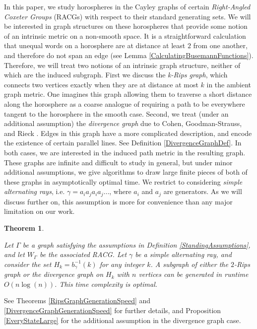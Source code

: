 \documentclass[10pt,a4paper]{amsart}
\newtheorem{theorem}{Theorem}[subsection]
\theoremstyle{definition}
\theoremstyle{remark}
\begin{document}
	In this paper, we study horospheres in the Cayley graphs of certain \textit{Right-Angled Coxeter Groups} (RACGs) with respect to their standard generating sets. We will be interested in graph structures on these horospheres that provide some notion of an intrinsic metric on a non-smooth space. It is a straightforward calculation that unequal words on a horosphere are at distance at least $2$ from one another, and therefore do not span an edge (see Lemma \ref{CalculatingBusemannFunctions}). Therefore, we will treat two notions of an intrinsic graph structure, neither of which are the induced subgraph. First we discuss the \textit{k-Rips graph}, which connects two vertices exactly when they are at distance at most $k$ in the ambient graph metric. One imagines this graph allowing them to traverse a short distance along the horosphere as a coarse analogue of requiring a path to be everywhere tangent to the horosphere in the smooth case. Second, we treat (under an additional assumption) the \textit{divergence graph} due to Cohen, Goodman-Strauss, and Rieck \cite{CGSR}. Edges in this graph have a more complicated description, and encode the existence of certain parallel lines. See Definition \ref{DivergenceGraphDef}. In both cases, we are interested in the induced path metric in the resulting graph. These graphs are infinite and difficult to study in general, but under minor additional assumptions, we give algorithms to draw large finite pieces of both of these graphs in asymptotically optimal time. We restrict to considering \textit{simple alternating rays}, i.e. $\gamma=a_ia_ja_ia_j ...$, where $a_i$ and $a_j$ are generators. As we will discuss further on, this assumption is more for convenience than any major limitation on our work.
	
	\begin{theorem} \label{IntroMainThm}
		
		Let $\Gamma$ be a graph satisfying the assumptions in Definition \ref{StandingAssumptions}, and let $W_\Gamma$ be the associated RACG. Let $\gamma$ be a simple alternating ray, and consider the set $H_k=b_\gamma^{-1}(k)$ for any integer $k$. A subgraph of either the $2$-Rips graph or the divergence graph on $H_k$ with $n$ vertices can be generated in runtime $O(n\log(n))$. This time complexity is optimal.
		
	\end{theorem}
	
	See Theorems \ref{RipsGraphGenerationSpeed} and \ref{DivergenceGraphGenerationSpeed} for further details, and Proposition \ref{EveryStateLarge} for the additional assumption in the divergence graph case.
	
\end{document}
